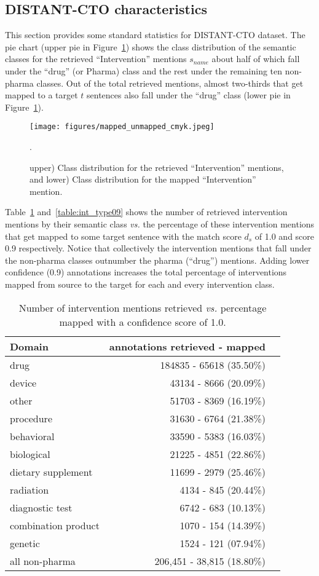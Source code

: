 \documentclass[letterpaper]{article} %
\begin{document}
\subsection{DISTANT-CTO characteristics}
\label{app:char}
%
This section provides some standard statistics for DISTANT-CTO dataset.
The pie chart (upper pie in Figure~\ref{app:classdist}) shows the class distribution of the semantic classes for the retrieved ``Intervention'' mentions $s_{name}$ about half of which fall under the ``drug'' (or Pharma) class and the rest under the remaining ten non-pharma classes.
Out of the total retrieved mentions, almost two-thirds that get mapped to a target $t$ sentences also fall under the ``drug'' class (lower pie in Figure~\ref{app:classdist}).
%
\begin{figure}[ht]
\centering
\texttt{[image: figures/mapped\_unmapped\_cmyk.jpeg]}
\caption{upper) Class distribution for the retrieved ``Intervention'' mentions, and lower) Class distribution for the mapped ``Intervention'' mention.}.
\label{app:classdist}
\end{figure}
%
%
%
Table~\ref{table:int_type10} and~\ref{table:int_type09} shows the number of retrieved intervention mentions by their semantic class \textit{vs.} the percentage of these intervention mentions that get mapped to some target sentence with the match score $d_s$ of 1.0 and score 0.9 respectively.
Notice that collectively the intervention mentions that fall under the non-pharma classes outnumber the pharma (``drug'') mentions.
Adding lower confidence (0.9) annotations increases the total percentage of interventions mapped from source to the target for each and every intervention class.
%
\begin{table}[!htbp]
\centering
\begin{tabular}{lrl}
\hline \textbf{Domain} & \textbf{ annotations retrieved - mapped } \\ \hline
drug & 184835 - 65618 (35.50\%) \\
device & 43134 - 8666 (20.09\%) \\
other & 51703 - 8369 (16.19\%) \\
procedure & 31630 - 6764 (21.38\%) \\
behavioral & 33590 - 5383 (16.03\%) \\
biological & 21225 - 4851 (22.86\%) \\
dietary supplement & 11699 - 2979 (25.46\%) \\
radiation & 4134 - 845 (20.44\%) \\
diagnostic test & 6742 - 683 (10.13\%) \\
combination product & 1070 - 154 (14.39\%) \\
genetic & 1524 - 121 (07.94\%) \\
all non-pharma & 206,451 - 38,815 (18.80\%)\\
\hline
\end{tabular}
\caption{Number of intervention mentions retrieved \textit{vs.} percentage mapped with a confidence score of 1.0.}
\label{table:int_type10} 
\end{table}
\end{document}
